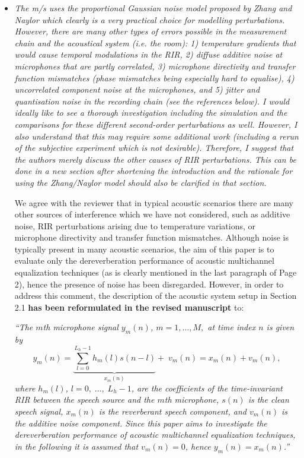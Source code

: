 \documentclass[10pt, a4paper]{article}
\begin{document}
\begin{itemize}
\item {\textit{The m/s uses the proportional Gaussian noise model proposed by Zhang and Naylor which clearly is a very practical choice for modelling perturbations. However, there are many other types of errors possible in the measurement chain and the acoustical system (i.e. the room): 1) temperature gradients that would cause temporal modulations in the RIR, 2) diffuse additive noise at microphones that are partly correlated, 3) microphone directivity and transfer function mismatches (phase mismatches being especially hard to equalise), 4) uncorrelated component noise at the microphones, and 5) jitter and quantisation noise in the recording chain (see the references below).
I would ideally like to see a thorough investigation including the simulation and the comparisons for these different second-order perturbations as well. However, I also understand that this may require some additional work (including a rerun of the subjective experiment which is not desirable). Therefore, I suggest that the authors merely discuss the other causes of RIR perturbations. This can be done in a new section after shortening the introduction and the rationale for using the Zhang/Naylor model should also be clarified in that section.}}

We agree with the reviewer that in typical acoustic scenarios there are many other sources of interference which we have not considered, such as additive noise, RIR perturbations arising due to temperature variations, or microphone directivity and transfer function mismatches.
Although noise is typically present in many acoustic scenarios, the aim of this paper is to evaluate only the dereverberation performance of acoustic multichannel equalization techniques (as is clearly mentioned in the last paragraph of Page 2), hence the presence of noise has been disregarded.
However, in order to address this comment, the description of the acoustic system setup in Section 2.1 {\textbf{has been reformulated in the revised manuscript}} to:

{\emph{``The $m$th microphone signal $y_m(n)$, $m = 1, \ldots, M,$ at time index $n$ is given by 
\begin{equation}
y_m(n) = \underbrace{\sum_{l = 0}^{L_h-1}h_m(l)s(n-l)}_{x_m(n)} + \; v_m(n) = x_m(n) + v_m(n),
\end{equation}
where $h_m(l)$, $l = 0, \; \ldots, \; L_h-1$, are the coefficients of the time-invariant RIR between the speech source and the $m$th microphone, $s(n)$ is the clean speech signal, $x_m(n)$ is the reverberant speech component, and $v_m(n)$ is the additive noise component.
Since this paper aims to investigate the dereverberation performance of acoustic multichannel equalization techniques, in the following it is assumed that $v_m(n) = 0$, hence $y_m(n) = x_m(n)$.''}}


\end{itemize}
\end{document}
